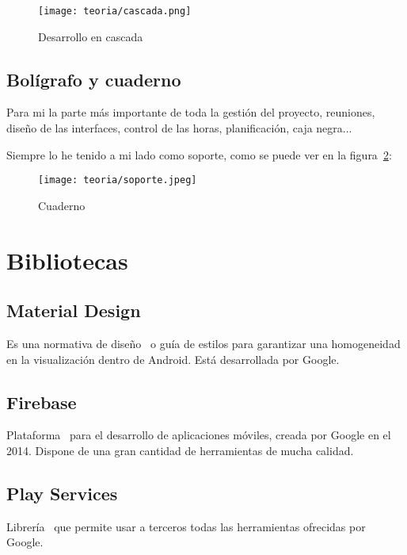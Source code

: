 \begin{figure}[H]
	\centering
	\texttt{[image: teoria/cascada.png]}
	\caption{Desarrollo en cascada}\label{fig:cascada}
\end{figure}

\subsection{Bolígrafo y cuaderno}
Para mi la parte más importante de toda la gestión del proyecto, reuniones, diseño de las interfaces, control de las horas, planificación, caja negra... 

Siempre lo he tenido a mi lado como soporte, como se puede ver en la figura~\ref{fig:soporte}:

\begin{figure}[H]
	\centering
	\texttt{[image: teoria/soporte.jpeg]}
	\caption{Cuaderno}\label{fig:soporte}
\end{figure}

\section{Bibliotecas}

\subsection{Material Design}
Es una normativa de diseño~\cite{google:material} o guía de estilos para garantizar una homogeneidad en la visualización dentro de Android. Está desarrollada por Google.

\subsection{Firebase}
Plataforma~\cite{google:firebase} para el desarrollo de aplicaciones móviles, creada por Google en el 2014. Dispone de una gran cantidad de herramientas de mucha calidad.

\subsection{Play Services }
Librería~\cite{google:playservices} que permite usar a terceros todas las herramientas ofrecidas por Google.